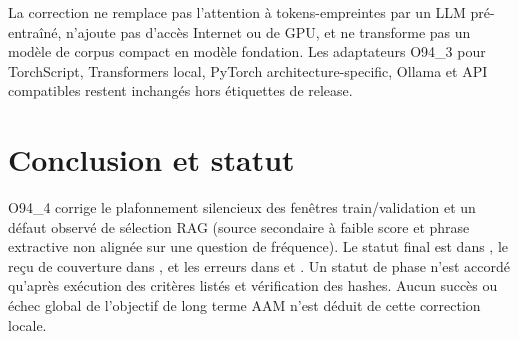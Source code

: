 \documentclass[11pt,a4paper]{article}
\begin{document}
La correction ne remplace pas l'attention à tokens-empreintes par un LLM pré-entraîné, n'ajoute pas d'accès Internet ou de GPU, et ne transforme pas un modèle de corpus compact en modèle fondation. Les adaptateurs O94\_3 pour TorchScript, Transformers local, PyTorch architecture-specific, Ollama et API compatibles restent inchangés hors étiquettes de release.

\section{Conclusion et statut}
O94\_4 corrige le plafonnement silencieux des fenêtres train/validation et un défaut observé de sélection RAG (source secondaire à faible score et phrase extractive non alignée sur une question de fréquence). Le statut final est dans \texttt{}, le reçu de couverture dans \texttt{}, et les erreurs dans \texttt{} et \texttt{}. Un statut de phase n'est accordé qu'après exécution des critères listés et vérification des hashes. Aucun succès ou échec global de l'objectif de long terme AAM n'est déduit de cette correction locale.

\end{document}
